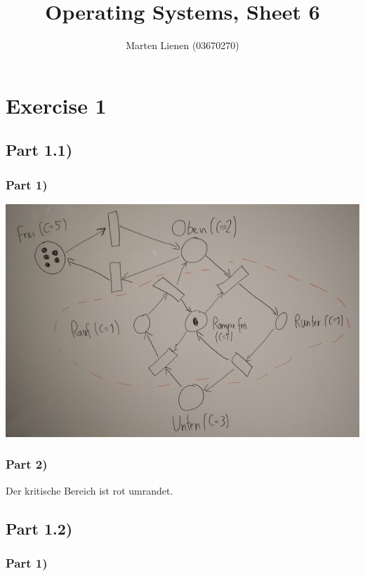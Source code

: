 \documentclass[10pt,a4paper]{article}
\title{Operating Systems, Sheet 6}
\author{Marten Lienen (03670270)}
\begin{document}
\maketitle

\section*{Exercise 1}

\subsection*{Part 1.1)}

\subsubsection*{Part 1)}

\includegraphics[width=\textwidth]{sheet-6/exercise-1-1-1}

\subsubsection*{Part 2)}

Der kritische Bereich ist rot umrandet.

\subsection*{Part 1.2)}

\subsubsection*{Part 1)}
\end{document}
